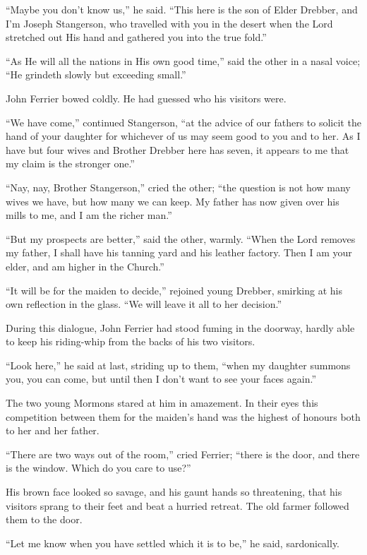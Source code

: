 \documentclass[12pt]{book}
\begin{document}
“Maybe you don’t know us,” he said. “This here is the son of Elder Drebber, and I’m Joseph Stangerson, who travelled with you in the desert when the Lord stretched out His hand and gathered you into the true fold.” 

“As He will all the nations in His own good time,” said the other in a nasal voice; “He grindeth slowly but exceeding small.” 

John Ferrier bowed coldly. He had guessed who his visitors were. 

“We have come,” continued Stangerson, “at the advice of our fathers to solicit the hand of your daughter for whichever of us may seem good to you and to her. As I have but four wives and Brother Drebber here has seven, it appears to me that my claim is the stronger one.” 

“Nay, nay, Brother Stangerson,” cried the other; “the question is not how many wives we have, but how many we can keep. My father has now given over his mills to me, and I am the richer man.” 

“But my prospects are better,” said the other, warmly. “When the Lord removes my father, I shall have his tanning yard and his leather factory. Then I am your elder, and am higher in the Church.” 

“It will be for the maiden to decide,” rejoined young Drebber, smirking at his own reflection in the glass. “We will leave it all to her decision.” 

During this dialogue, John Ferrier had stood fuming in the doorway, hardly able to keep his riding-whip from the backs of his two visitors. 

“Look here,” he said at last, striding up to them, “when my daughter summons you, you can come, but until then I don’t want to see your faces again.” 

The two young Mormons stared at him in amazement. In their eyes this competition between them for the maiden’s hand was the highest of honours both to her and her father. 

“There are two ways out of the room,” cried Ferrier; “there is the door, and there is the window. Which do you care to use?” 

His brown face looked so savage, and his gaunt hands so threatening, that his visitors sprang to their feet and beat a hurried retreat. The old farmer followed them to the door. 

“Let me know when you have settled which it is to be,” he said, sardonically. 
\end{document}
